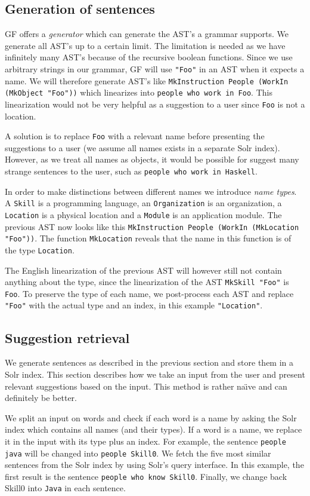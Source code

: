 \documentclass[10pt, a4paper]{article}
\begin{document}
\subsection{Generation of sentences}
GF offers a \emph{generator} which can generate the AST's a grammar supports. We generate all AST's up to a certain limit. The limitation is needed as we have infinitely many AST's because of the recursive boolean functions. Since we use arbitrary strings in our grammar, GF will use  \texttt{"Foo"} in an AST when it expects a name. We will therefore generate AST's like \texttt{MkInstruction People (WorkIn (MkObject "Foo"))} which linearizes into \texttt{people who work in Foo}. This linearization would not be very helpful as a suggestion to a user since \texttt{Foo} is not a location.

A solution is to replace \texttt{Foo} with a relevant name before presenting the suggestions to a user (we assume all names exists in a separate Solr index). However, as we treat all names as objects, it would be possible for suggest many strange sentences to the user, such as \texttt{people who work in Haskell}.

In order to make distinctions between different names we introduce \emph{name types}. A \texttt{Skill} is a programming language, an \texttt{Organization} is an organization, a \texttt{Location} is a physical location and a \texttt{Module} is an application module. The previous AST now looks like this \texttt{MkInstruction People (WorkIn (MkLocation "Foo"))}. The function \texttt{MkLocation} reveals that the name in this function is of the type \texttt{Location}. 

The English linearization of the previous AST will however still not contain anything about the type, since the linearization of the AST \texttt{MkSkill "Foo"} is \texttt{Foo}. To preserve the type of each name, we post-process each AST and replace \texttt{"Foo"} with the actual type and an index, in this example \texttt{"Location"}.

\subsection{Suggestion retrieval}
 We generate sentences as described in the previous section and store them in a Solr index. This section describes how we take an input from the user and present relevant suggestions based on the input. This method is rather na\"{\i}ve and can definitely be better.

 We split an input on words and check if each word is a name by asking the Solr index which contains all names (and their types). If a word is a name, we replace it in the input with its type plus an index. For example, the sentence \texttt{people java} will be changed into \texttt{people Skill0}. We fetch the five most similar sentences from the Solr index by using Solr's query interface. In this example, the first result is the sentence \texttt{people who know Skill0}. Finally, we change back Skill0 into \texttt{Java} in each sentence.
\end{document}

